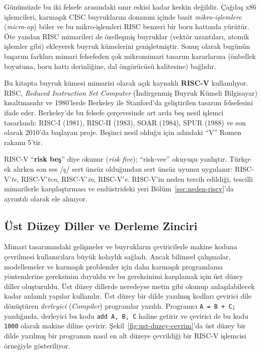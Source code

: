 Günümüzde bu iki felsefe arasındaki sınır eskisi kadar keskin değildir. Çağdaş x86 işlemcileri, karmaşık CISC buyruklarını donanım içinde basit \emph{mikro-işlemlere} (\emph{micro-op}) böler ve bu mikro-işlemleri RISC benzeri bir boru hattında yürütür. Öte yandan RISC mimarileri de özelleşmiş buyruklar (vektör uzantıları, atomik işlemler gibi) ekleyerek buyruk kümelerini genişletmiştir. Sonuç olarak bugünün başarım farkları mimari felsefeden çok mikromimari tasarım kararlarına (önbellek boyutuna, boru hattı derinliğine, dal öngörücüsü kalitesine) bağlıdır.

\begin{bilginot}
Bu kitapta buyruk kümesi mimarisi olarak açık kaynaklı \textbf{RISC-V} kullanılıyor. RISC, \emph{Reduced Instruction Set Computer} (İndirgenmiş Buyruk Kümeli Bilgisayar) kısaltmasıdır ve 1980'lerde Berkeley ile Stanford'da geliştirilen tasarım felsefesini ifade eder. Berkeley'de bu felsefe çerçevesinde art arda beş nesil işlemci tasarlandı: RISC-I (1981), RISC-II (1983), SOAR (1984), SPUR (1988) ve son olarak 2010'da başlayan proje. Beşinci nesil olduğu için adındaki ``V'' Romen rakamı 5'tir.

RISC-V ``\textbf{risk beş}'' diye okunur (\emph{risk five}); ``risk-vee'' okuyuşu yanlıştır. Türkçe ek alırken son ses /ş/ sert ünsüz olduğundan sert ünsüz uyumu uygulanır: RISC-V'\emph{te}, RISC-V'\emph{ten}, RISC-V'\emph{in}, RISC-V'\emph{e}. RISC-V'in neden tercih edildiği, tescilli mimarilerle karşılaştırması ve endüstrideki yeri Bölüm~\ref{sec:neden-riscv}'da ayrıntılı olarak ele alınıyor.
\end{bilginot}

\subsection{Üst Düzey Diller ve Derleme Zinciri}
\label{subsec:ust-duzey-diller}

Mimari tasarımındaki gelişmeler ve buyrukların çeviricilerle makine koduna çevrilmesi kullanıcılara büyük kolaylık sağladı. Ancak bilimsel çalışmalar, modellemeler ve karmaşık problemler için daha karmaşık programlama yöntemlerine gereksinim duyuldu ve bu gereksinimi karşılamak için üst düzey diller oluşturuldu. Üst düzey dillerde neredeyse metin gibi okunup anlaşılabilecek kadar anlamlı yapılar kullanılır. Üst düzey bir dilde yazılmış kodları çevirici dile dönüştüren \emph{derleyici} (\emph{Compiler}) programlar yazıldı. Programcı \texttt{A = B + C;} yazdığında, derleyici bu kodu \texttt{add A, B, C} haline getirir ve çevirici de bu kodu \texttt{1000} olarak makine diline çevirir. Şekil~\ref{fig:ust-duzey-cevrim}'da üst düzey bir dilde yazılmış bir programın nasıl en alt düzeye çevrildiği bir RISC-V işlemcisi örneğiyle gösteriliyor.


